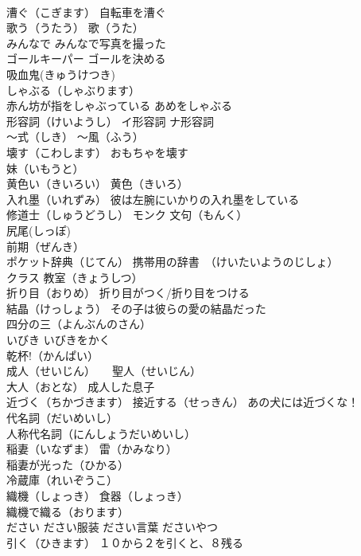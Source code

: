 \documentclass[8pt]{extreport}
\begin{document}
\begin{CJK}{UTF8}{min}
\\	漕ぐ（こぎます） 自転車を漕ぐ
\\	歌う（うたう） 歌（うた）
\\	みんなで みんなで写真を撮った
\\	ゴールキーパー ゴールを決める
\\	吸血鬼(きゅうけつき)
\\	しゃぶる（しゃぶります） 
\\	赤ん坊が指をしゃぶっている あめをしゃぶる
\\	形容詞（けいようし） イ形容詞 ナ形容詞
\\	～式（しき） ～風（ふう）
\\	壊す（こわします） おもちゃを壊す
\\	妹（いもうと）
\\	黄色い（きいろい） 黄色（きいろ）
\\	入れ墨（いれずみ） 彼は左腕にいかりの入れ墨をしている
\\	修道士（しゅうどうし） モンク 文句（もんく）
\\	尻尾(しっぽ)
\\	前期（ぜんき）
\\	ポケット辞典（じてん） 携帯用の辞書　（けいたいようのじしょ）
\\	クラス 教室（きょうしつ）
\\	折り目（おりめ） 折り目がつく/折り目をつける
\\	結晶（けっしょう） その子は彼らの愛の結晶だった
\\	四分の三（よんぶんのさん）
\\	いびき いびきをかく
\\	乾杯!（かんぱい）
\\	成人（せいじん）　　聖人（せいじん）
\\	大人（おとな） 成人した息子
\\	近づく（ちかづきます） 接近する（せっきん） あの犬には近づくな！
\\	代名詞（だいめいし） 
\\	人称代名詞（にんしょうだいめいし）
\\	稲妻（いなずま） 雷（かみなり） 
\\	稲妻が光った（ひかる）
\\	冷蔵庫（れいぞうこ）
\\	織機（しょっき） 食器（しょっき）
\\	織機で織る（おります）
\\	ださい ださい服装 ださい言葉 ださいやつ
\\	引く（ひきます） １０から２を引くと、８残る

\end{CJK}
\end{document}
